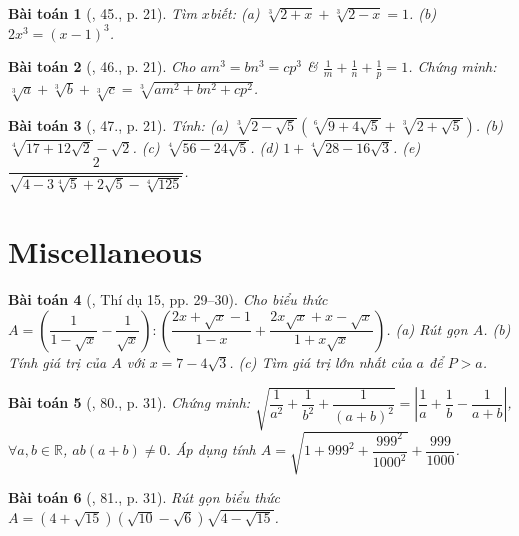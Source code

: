 \documentclass{article}
\newtheorem{baitoan}{Bài toán}
\begin{document}
\begin{baitoan}[\cite{Binh_Toan_9_tap_1}, 45., p. 21]
	Tìm $x$biết: (a) $\sqrt[3]{2 + x} + \sqrt[3]{2 - x} = 1$. (b) $2x^3 = (x - 1)^3$.
\end{baitoan}

\begin{baitoan}[\cite{Binh_Toan_9_tap_1}, 46., p. 21]
	Cho $am^3 = bn^3 = cp^3$ \& $\frac{1}{m} + \frac{1}{n} + \frac{1}{p} = 1$. Chứng minh: $\sqrt[3]{a} + \sqrt[3]{b} + \sqrt[3]{c} = \sqrt[3]{am^2 + bn^2 + cp^2}$.
\end{baitoan}

\begin{baitoan}[\cite{Binh_Toan_9_tap_1}, 47., p. 21]
	 Tính: (a) $\sqrt[3]{2 - \sqrt{5}}(\sqrt[6]{9 + 4\sqrt{5}} + \sqrt[3]{2 + \sqrt{5}})$. (b) $\sqrt[4]{17 + 12\sqrt{2}} - \sqrt{2}$. (c) $\sqrt[4]{56 - 24\sqrt{5}}$. (d) $1 + \sqrt[4]{28 - 16\sqrt{3}}$. (e) $\dfrac{2}{\sqrt{4 - 3\sqrt[4]{5} + 2\sqrt{5} - \sqrt[4]{125}}}$.
\end{baitoan}


\section{Miscellaneous}

\begin{baitoan}[\cite{Tuyen_Toan_9}, Thí dụ 15, pp. 29--30]
	Cho biểu thức $A = \left(\dfrac{1}{1 - \sqrt{x}} - \dfrac{1}{\sqrt{x}}\right):\left(\dfrac{2x + \sqrt{x} - 1}{1 - x} + \dfrac{2x\sqrt{x} + x - \sqrt{x}}{1 + x\sqrt{x}}\right)$. (a) Rút gọn $A$. (b) Tính giá trị của $A$ với $x = 7 - 4\sqrt{3}$. (c) Tìm giá trị lớn nhất của $a$ để $P > a$.
\end{baitoan}

\begin{baitoan}[\cite{Tuyen_Toan_9}, 80., p. 31]
	Chứng minh: $\sqrt{\dfrac{1}{a^2} + \dfrac{1}{b^2} + \dfrac{1}{(a + b)^2}} = \left|\dfrac{1}{a} + \dfrac{1}{b} - \dfrac{1}{a + b}\right|$, $\forall a,b\in\mathbb{R}$, $ab(a + b)\ne0$. Áp dụng tính $A = \sqrt{1 + 999^2 + \dfrac{999^2}{1000^2}} + \dfrac{999}{1000}$.
\end{baitoan}

\begin{baitoan}[\cite{Tuyen_Toan_9}, 81., p. 31]
	Rút gọn biểu thức $A = (4 + \sqrt{15})(\sqrt{10} - \sqrt{6})\sqrt{4 - \sqrt{15}}$.
\end{baitoan}
\end{document}
